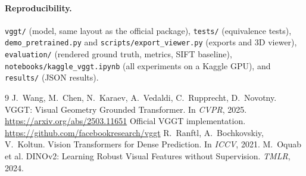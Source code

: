 \documentclass[11pt,a4paper]{article}
\begin{document}
\paragraph{Reproducibility.} \texttt{vggt/} (model, same layout as the official package), \texttt{tests/} (equivalence tests),
\texttt{demo\_pretrained.py} and \texttt{scripts/export\_viewer.py} (exports and 3D viewer), \texttt{evaluation/} (rendered
ground truth, metrics, SIFT baseline), \texttt{notebooks/kaggle\_vggt.ipynb} (all experiments on a Kaggle GPU), and
\texttt{results/} (JSON results).

\begin{thebibliography}{9}
 J.~Wang, M.~Chen, N.~Karaev, A.~Vedaldi, C.~Rupprecht, D.~Novotny.
  \newblock VGGT: Visual Geometry Grounded Transformer.
  \newblock In \emph{CVPR}, 2025. \url{https://arxiv.org/abs/2503.11651}
 Official VGGT implementation. \url{https://github.com/facebookresearch/vggt}
 R.~Ranftl, A.~Bochkovskiy, V.~Koltun. Vision Transformers for Dense Prediction. In \emph{ICCV}, 2021.
 M.~Oquab et al. DINOv2: Learning Robust Visual Features without Supervision. \emph{TMLR}, 2024.
\end{thebibliography}
\end{document}
